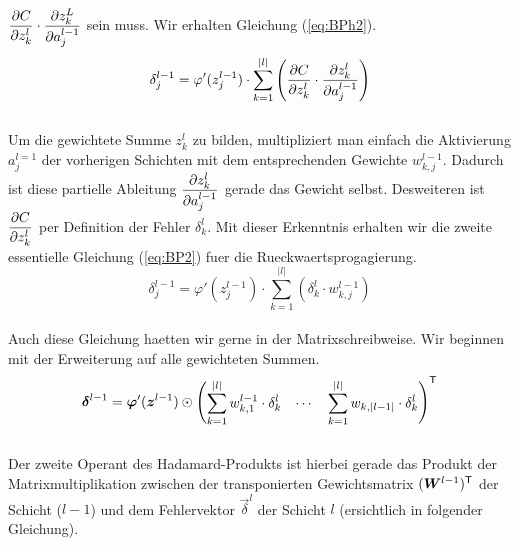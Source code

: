 $\displaystyle\frac{\partial C}{\partial z_k^l} \cdot \displaystyle\frac{\partial z_k^L}{\partial a_j^{l-1}}$ sein muss. Wir
erhalten Gleichung (\ref{eq:BPh2}).
\\
\begin{equation}\label{eq:BPh2}
  \delta_j^{l-1} = \varphi'(z_j^{l-1}) \cdot \sum_{k=1}^{|l|} \left( \frac{\partial C}{\partial z_k^l} \cdot \frac{\partial z_k^l}{\partial a_j^{l-1}} \right)
\end{equation}
\\
Um die gewichtete Summe $z_k^l$ zu bilden, multipliziert man einfach die
Aktivierung $a_j^{l=1}$ der vorherigen Schichten mit dem entsprechenden Gewichte $w_{k,j}^{l-1}$.
Dadurch ist diese partielle Ableitung $\displaystyle\frac{\partial z_k^l}{\partial a_j^{l-1}}$ gerade das
Gewicht selbst. Desweiteren ist $\displaystyle\frac{\partial C}{\partial z_k^l}$ per Definition der
Fehler $\delta_k^l$. Mit dieser Erkenntnis erhalten wir die zweite essentielle
Gleichung (\ref{eq:BP2}) fuer die Rueckwaertsprogagierung.
\\
\begin{equation}\tag{BP2}\label{eq:BP2}
  \delta_j^{l-1} = \varphi'(z_j^{l-1}) \cdot \sum_{k=1}^{|l|} \left( \delta_k^l \cdot w_{k,j}^{l-1} \right)
\end{equation}
\\
Auch diese Gleichung haetten wir gerne in der Matrixschreibweise. Wir beginnen
mit der Erweiterung auf alle gewichteten Summen.
\\
\begin{equation*}
  \bm{\delta}^{l-1} = \bm{\varphi}'(\bm{z}^{l-1}) \odot \begin{pmatrix} \displaystyle\sum_{k=1}^{|l|} w_{k,1}^{l-1} \cdot \delta_k^l & \cdots & \displaystyle\sum_{k=1}^{|l|} w_{k,|l-1|} \cdot \delta_k^l \end{pmatrix}^{\mathsf{T}}
\end{equation*}
\\
Der zweite Operant des Hadamard-Produkts ist hierbei gerade das Produkt der
Matrixmultiplikation zwischen
der transponierten Gewichtsmatrix $(\bm{W}^{l-1})^{\mathsf{T}}$ der Schicht ($l-1$)
und dem Fehlervektor $\vec{\delta}^l$ der Schicht $l$ (ersichtlich in folgender Gleichung).

